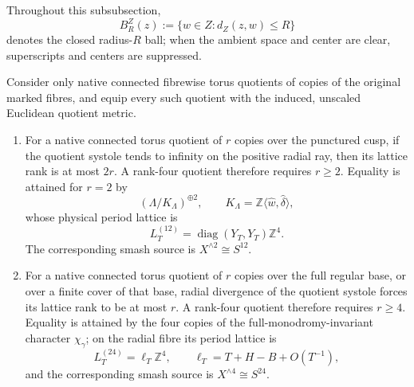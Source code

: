 Throughout this subsubsection,
\[
 B_R^Z(z):=\{w\in Z:d_Z(z,w)\leq R\}
\]
denotes the closed radius-\(R\) ball; when the ambient space and center are
clear, superscripts and centers are suppressed.

\begin{theorem}
\label{wb:cusp-cone-optimal-exponents}

Consider only native connected fibrewise torus quotients of copies of the
original marked fibres, and equip every such quotient with the induced,
unscaled Euclidean quotient metric.

\begin{enumerate}
\item For a native connected torus quotient of \(r\) copies over the
punctured cusp, if the quotient systole tends to infinity on the positive
radial ray, then its lattice rank is at most \(2r\).  A rank-four quotient
therefore requires \(r\geq2\).  Equality is attained for \(r=2\) by
\[
 (\Lambda/K_\Lambda)^{\oplus2},
 \qquad K_\Lambda=
 \mathbb Z\langle\widehat w,\widehat\delta\rangle,
\]
whose physical period lattice is
\[
 L_T^{(12)}=\operatorname{diag}(Y_T,Y_T)\mathbb Z^4.
\]
The corresponding smash source is
\(X^{\wedge2}\cong S^{12}\).

\item For a native connected torus quotient of \(r\) copies over the full
regular base, or over a finite cover of that base, radial divergence of the
quotient systole forces its lattice rank to be at most \(r\).  A rank-four
quotient therefore requires \(r\geq4\).  Equality is attained by the four
copies of the full-monodromy-invariant character \(\chi_\gamma\); on the
radial fibre its period lattice is
\[
 L_T^{(24)}=\ell_T\mathbb Z^4,
 \qquad
 \ell_T=T+H-B+O(T^{-1}),
\]
and the corresponding smash source is
\(X^{\wedge4}\cong S^{24}\).
\end{enumerate}


\end{theorem}

